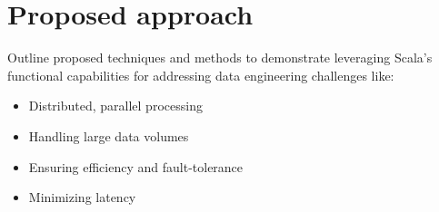 \chapter{Proposed approach}

Outline proposed techniques and methods to demonstrate leveraging Scala's functional capabilities for addressing data engineering challenges like:

\begin{itemize}
\item Distributed, parallel processing
\item Handling large data volumes
\item Ensuring efficiency and fault-tolerance
\item Minimizing latency
\end{itemize}